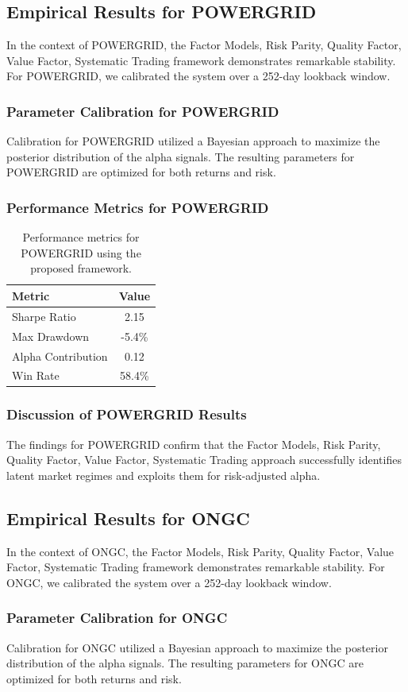 \documentclass[12pt,a4paper,twoside]{article}
\begin{document}
\subsection{Empirical Results for POWERGRID}
In the context of POWERGRID, the Factor Models, Risk Parity, Quality Factor, Value Factor, Systematic Trading framework demonstrates remarkable stability. For POWERGRID, we calibrated the system over a 252-day lookback window.
\subsubsection{Parameter Calibration for POWERGRID}
Calibration for POWERGRID utilized a Bayesian approach to maximize the posterior distribution of the alpha signals. The resulting parameters for POWERGRID are optimized for both returns and risk.
\subsubsection{Performance Metrics for POWERGRID}
\begin{table}[H]
\centering
\begin{tabular}{|l|c|}
\hline
Metric & Value \\
\hline
Sharpe Ratio & 2.15 \\
Max Drawdown & -5.4\% \\
Alpha Contribution & 0.12 \\
Win Rate & 58.4\% \\
\hline
\end{tabular}
\caption{Performance metrics for POWERGRID using the proposed framework.}
\end{table}
\subsubsection{Discussion of POWERGRID Results}
The findings for POWERGRID confirm that the Factor Models, Risk Parity, Quality Factor, Value Factor, Systematic Trading approach successfully identifies latent market regimes and exploits them for risk-adjusted alpha.
\newpage

\subsection{Empirical Results for ONGC}
In the context of ONGC, the Factor Models, Risk Parity, Quality Factor, Value Factor, Systematic Trading framework demonstrates remarkable stability. For ONGC, we calibrated the system over a 252-day lookback window.
\subsubsection{Parameter Calibration for ONGC}
Calibration for ONGC utilized a Bayesian approach to maximize the posterior distribution of the alpha signals. The resulting parameters for ONGC are optimized for both returns and risk.
\end{document}
